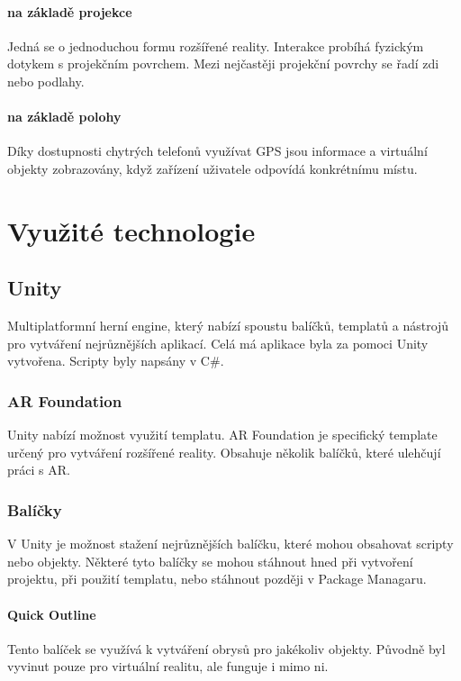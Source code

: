 \documentclass[12pt, a4paper,
twoside,        %
openright
]{report}
\begin{document}
\subsubsection{na základě projekce}
Jedná se o jednoduchou formu rozšířené reality. Interakce probíhá fyzickým dotykem s projekčním povrchem. Mezi nejčastěji projekční povrchy se řadí zdi nebo podlahy.

\subsubsection{na základě polohy}
Díky dostupnosti chytrých telefonů využívat GPS jsou informace a virtuální objekty zobrazovány, když zařízení uživatele odpovídá konkrétnímu místu. 

	

\chapter{Využité technologie}
	
\section{Unity}
\label{sec:Unity}
Multiplatformní herní engine, který nabízí spoustu balíčků, templatů a nástrojů pro vytváření nejrůznějších aplikací. Celá má aplikace byla za pomoci Unity vytvořena. Scripty byly napsány v C\#.

\subsection{AR Foundation}
Unity nabízí možnost využití templatu. AR Foundation je specifický template určený pro vytváření rozšířené reality. Obsahuje několik balíčků, které ulehčují práci s AR. 


\subsection{Balíčky}
V Unity je možnost stažení nejrůznějších balíčku, které mohou obsahovat scripty nebo objekty. Některé tyto balíčky se mohou stáhnout hned při vytvoření projektu, při použití templatu, nebo stáhnout později v Package Managaru.

\subsubsection{Quick Outline}
Tento balíček se využívá k vytváření obrysů pro jakékoliv objekty. Původně byl vyvinut pouze pro virtuální realitu, ale funguje i mimo ni. 
\end{document}
